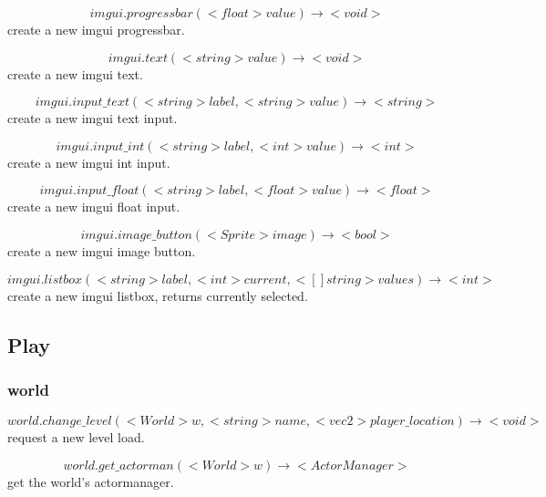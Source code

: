 \documentclass[11pt,fleqn]{book} %
\begin{document}
\begin{equation}
imgui.progressbar(<float> value) \rightarrow <void>
\end{equation}
create a new imgui progressbar.

\begin{equation}
imgui.text(<string> value) \rightarrow <void>
\end{equation}
create a new imgui text.

\begin{equation}
imgui.input\_text(<string> label, <string> value) \rightarrow <string>
\end{equation}
create a new imgui text input.

\begin{equation}
imgui.input\_int(<string> label, <int> value) \rightarrow <int>
\end{equation}
create a new imgui int input.

\begin{equation}
imgui.input\_float(<string> label, <float> value) \rightarrow <float>
\end{equation}
create a new imgui float input.

\begin{equation}
imgui.image\_button(<Sprite> image) \rightarrow <bool>
\end{equation}
create a new imgui image button.

\begin{equation}
imgui.listbox(<string> label, <int> current, <[]string> values) \rightarrow <int>
\end{equation}
create a new imgui listbox, returns currently selected.

\subsection{Play}
\subsubsection{world}

\begin{equation}
world.change\_level(<World> w, <string> name, <vec2> player\_location) \rightarrow <void>
\end{equation}
request a new level load.

\begin{equation}
world.get\_actorman(<World> w) \rightarrow <ActorManager>
\end{equation}
get the world's actormanager.
\end{document}
